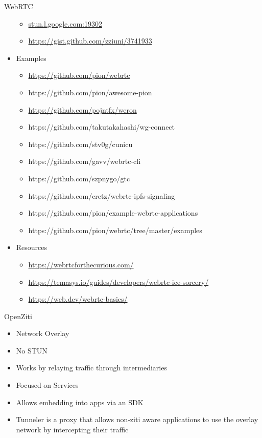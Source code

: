 \begin{block}{WebRTC}
\begin{itemize}
  \begin{itemize}
  \tightlist
  \item
    \href{http://stun.l.google.com:19302/}{stun.l.google.com:19302}
  \item
    \url{https://gist.github.com/zziuni/3741933}
  \end{itemize}
\item
  Examples

  \begin{itemize}
  \tightlist
  \item
    \url{https://github.com/pion/webrtc}
  \item
    https://github.com/pion/awesome-pion
  \item
    \url{https://github.com/pojntfx/weron}
  \item
    https://github.com/takutakahashi/wg-connect
  \item
    https://github.com/stv0g/cunicu
  \item
    https://github.com/gavv/webrtc-cli
  \item
    https://github.com/szpnygo/gtc
  \item
    https://github.com/cretz/webrtc-ipfs-signaling
  \item
    https://github.com/pion/example-webrtc-applications
  \item
    https://github.com/pion/webrtc/tree/master/examples
  \end{itemize}
\item
  Resources

  \begin{itemize}
  \tightlist
  \item
    \url{https://webrtcforthecurious.com/}
  \item
    \url{https://temasys.io/guides/developers/webrtc-ice-sorcery/}
  \item
    \href{https://web.dev/webrtc-basics/\#toc-rtcpeerconnection}{https://web.dev/webrtc-basics/}
  \end{itemize}
\end{itemize}
\end{block}

\hypertarget{notes__02180-openziti.md}{}
\begin{block}{OpenZiti}
\protect\hypertarget{notes__02180-openziti.md__openziti}{}
\begin{itemize}
\tightlist
\item
  Network Overlay
\item
  No STUN
\item
  Works by relaying traffic through intermediaries
\item
  Focused on Services
\item
  Allows embedding into apps via an SDK
\item
  Tunneler is a proxy that allows non-ziti aware applications to use the
  overlay network by intercepting their traffic
\end{itemize}
\end{block}

